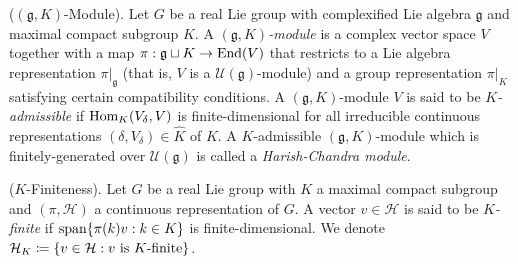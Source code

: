 \noindent\begin{definition}\textup{($(\mathfrak{g}, K)$-Module).} Let $G$ be a real Lie group with complexified Lie algebra $\mathfrak{g}$ and maximal compact subgroup $K$. A {\em $(\mathfrak{g}, K)$-module} is a complex vector space $V$ together with a map ${\pi : \mathfrak{g} \sqcup K \to \textup{End}(V)}$ that restricts to a Lie algebra representation $\pi\vert_\mathfrak{g}$ (that is, $V$ is a $\mathcal{U}(\mathfrak{g})$-module) and a group representation $\pi\vert_K$ satisfying certain compatibility conditions. A $(\mathfrak{g}, K)$-module $V$ is said to be {\em $K$-admissible} if $\textup{Hom}_K(V_\delta, V)$ is finite-dimensional for all irreducible continuous representations $(\delta, V_\delta) \in \widehat{K}$ of $K$. A $K$-admissible $(\mathfrak{g}, K)$-module which is finitely-generated over $\mathcal{U}(\mathfrak{g})$ is called a {\em Harish-Chandra module}.\\ %
\end{definition}

\noindent\begin{definition}\textup{($K$-Finiteness).} Let $G$ be a real Lie group with $K$ a maximal compact subgroup and $(\pi, \mathcal{H})$ a continuous representation of $G$. A vector $v \in \mathcal{H}$ is said to be {\em $K$-finite} if $\textup{span}\{\pi(k)v : k \in K\}$ is finite-dimensional. We denote $\mathcal{H}_K \coloneqq \{v \in \mathcal{H} : \textup{$v$ is $K$-finite}\}$.\\
\end{definition}


